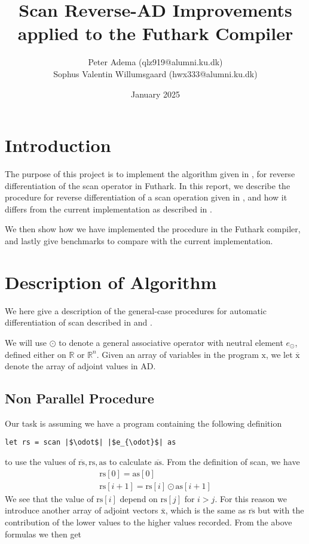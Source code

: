 \documentclass{article}
\title{Scan Reverse-AD Improvements applied to the Futhark Compiler}
\author{Peter Adema (qlz919@alumni.ku.dk)\\
Sophus Valentin Willumsgaard (hwx333@alumni.ku.dk)}
\date{January 2025}
\newcommand{\ors}{\overline{\text{rs}}}
\newcommand{\rs}{\text{rs}}
\newcommand{\oas}{\overline{\text{as}}}
\newcommand{\xo}{\overline{\text{x}}}
\newcommand{\as}{\text{as}}
\begin{document}
\maketitle
\tableofcontents
\section{Introduction}
The purpose of this project is to implement the algorithm given in \cite{PPAD}, for reverse
differentiation of the scan operator in Futhark.
In this report,
we describe the procedure for reverse differentiation of a
scan operation given in \cite{PPAD},
and how it differs from the current implementation as described in
\cite{Futhark}.

We then show how we have implemented the procedure in the Futhark compiler,
and lastly give benchmarks to compare with the current implementation.
\section{Description of Algorithm}
We here give a description of the general-case procedures for automatic differentiation of
scan described in \cite{PPAD} and \cite{Futhark}.

We will use \(\odot\) to denote a general associative operator with neutral
element \(e_{\odot}\), defined either on \(\mathbb{R}\) or \(\mathbb{R}^{n}\).
Given an array of variables in the program \(\text{x}\),
we let \(\xo\) denote the array of adjoint values in AD.
\subsection{Non Parallel Procedure}
Our task is assuming we have a program containing the following definition
\begin{verbatim}
let rs = scan |$\odot$| |$e_{\odot}$| as
\end{verbatim}
to use the values of \(\ors, \rs, \as\) to calculate \(\oas\).
From the definition of scan, we have
\begin{align*}
	\rs [0] = \as[0] \\
	\rs [i+1] = \rs[i] \odot \as[i+1]
\end{align*}
We see that the value of \(\rs[i]\) depend on \(\rs[j]\) for \(i>j\).
For this reason we introduce another array of adjoint vectors \(\xo\),
which is the same as \(\ors\) but with the contribution of the lower
values to the higher values recorded.
From the above formulas we then get
\end{document}
